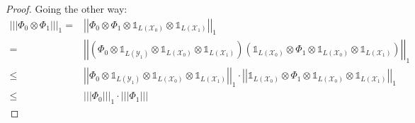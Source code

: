 \documentclass{article}
\begin{document}
\begin{proof}
    Going the other way: 
    \begin{align*}
        \left| \left| \left| \Phi_0 \otimes \Phi_1 \right|
                \right| \right|_1 =& \left| \left| \Phi_0 \otimes \Phi_1 \otimes
            \mathds{1}_{L(\mathcal{X}_0)} \otimes \mathds{1}_{L(\mathcal{X}_1)} \right|
        \right|_1 \\
        =& \left| \left| \left( \Phi_0 \otimes \mathds{1}_{L(\mathcal{Y}_1)} \otimes
    \mathds{1}_{L(\mathcal{X}_0)} \otimes \mathds{1}_{L(\mathcal{X}_1)} \right)
    \left( \mathds{1}_{L(\mathcal{X}_0)} \otimes \Phi_1 \otimes
    \mathds{1}_{L(\mathcal{X}_0)} \otimes \mathds{1}_{L(\mathcal{X}_1)} \right)
\right| \right|_1 \\
\le& \left| \left| \Phi_0 \otimes \mathds{1}_{L(\mathcal{Y}_1)} \otimes
\mathds{1}_{L(\mathcal{X}_0)} \otimes \mathds{1}_{L(\mathcal{X}_1)}\right|
\right|_1 \cdot \left| \left| \mathds{1}_{L(\mathcal{X}_0)} \otimes \Phi_1
    \otimes \mathds{1}_{L(\mathcal{X}_0)} \otimes \mathds{1}_{L(\mathcal{X}_1)}
\right| \right|_1 \\
\le& \left| \left| \left| \Phi_0 \right| \right| \right|_1 \cdot \left| \left|
\left| \Phi_1 \right| \right| \right|
    \end{align*}
\end{proof}
\end{document}
